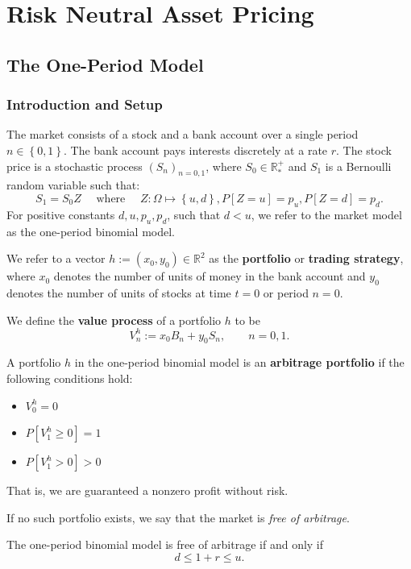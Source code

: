 \section{Risk Neutral Asset Pricing}
\subsection{The One-Period Model}
\subsubsection{Introduction and Setup}
The market consists of a stock and a bank account over a single period $n\in
\left\{ 0,1 \right\}$. The bank account pays interests discretely at a rate
$r$. The stock price is a stochastic process ${\left( S_{n} \right)}_{n=0,1}$,
where $S_0\in \mathbb{R}^{+}_{*}$ and $S_1$ is a Bernoulli random variable such that:
\[S_1=S_0Z\quad\text{ where }\quad Z:\Omega \mapsto \left\{ u,d \right\},P[Z=u]=p_u, P[Z=d]=p_d.\]
For positive constants $d,u,p_u,p_d$, such that $d<u$, we refer to the market
model as the one-period binomial model.
\begin{definition}
  We refer to a vector $h:=\left( x_0,y_0 \right)\in \mathbb{R}^{2}$ as
  the \textbf{portfolio} or \textbf{trading strategy}, where $x_0$ denotes the
  number of units of money in the bank account and $y_0$ denotes the
  number of units of stocks at time $t=0$ or period $n=0$.
\end{definition}
\begin{definition}
  We define the \textbf{value process} of a portfolio $h$ to be
  \[V_{n}^{h}:=x_0B_{n}+y_0S_{n},\qquad n=0,1.\]
\end{definition}
\begin{definition}[Arbitrage]
  A portfolio $h$ in the one-period binomial model is an \textbf{arbitrage portfolio} if the following
  conditions hold:
  \begin{itemize}
    \item $V_0^{h}=0$ 
    \item $P[V_1^{h}\ge 0]=1$
    \item $P[V_1^{h}> 0]>0$
  \end{itemize}
  That is, we are guaranteed a nonzero profit without risk.
\end{definition}
If no such portfolio exists, we say that the market is \textit{free of arbitrage}.
\begin{prop}
  The one-period binomial model is free of arbitrage if and only if
  \[d\le 1+r\le u.\]
\end{prop}
